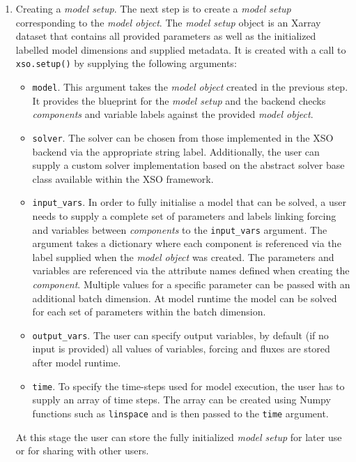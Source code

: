 \documentclass[journal abbreviation, manuscript]{copernicus}
\begin{document}
\begin{enumerate}
    \item Creating a \textit{model setup}. The next step is to create a \textit{model setup} corresponding to the \textit{model object}. The \textit{model setup} object is an Xarray dataset that contains all provided parameters as well as the initialized labelled model dimensions and supplied metadata. It is created with a call to \texttt{xso.setup()} by supplying the following arguments:
    \begin{itemize}
        \item \texttt{model}. This argument takes the \textit{model object} created in the previous step. It provides the blueprint for the \textit{model setup} and the backend checks \textit{components} and variable labels against the provided \textit{model object}.
        \item \texttt{solver}. The solver can be chosen from those implemented in the XSO backend via the appropriate string label. Additionally, the user can supply a custom solver implementation based on the abstract solver base class available within the XSO framework.
        \item \texttt{input\_vars}. In order to fully initialise a model that can be solved, a user needs to supply a complete set of parameters and labels linking forcing and variables between \textit{components} to the \texttt{input\_vars} argument. The argument takes a dictionary where each component is referenced via the label supplied when the \textit{model object} was created. The parameters and variables are referenced via the attribute names defined when creating the \textit{component}. Multiple values for a specific parameter can be passed with an additional batch dimension. At model runtime the model can be solved for each set of parameters within the batch dimension.
        \item \texttt{output\_vars}. The user can specify output variables, by default (if no input is provided) all values of variables, forcing and fluxes are stored after model runtime.
        \item \texttt{time}. To specify the time-steps used for model execution, the user has to supply an array of time steps. The array can be created using Numpy functions such as \texttt{linspace} and is then passed  to the \texttt{time} argument.
    \end{itemize}
    At this stage the user can store the fully initialized \textit{model setup} for later use or for sharing with other users.
    

\end{enumerate}
\end{document}
